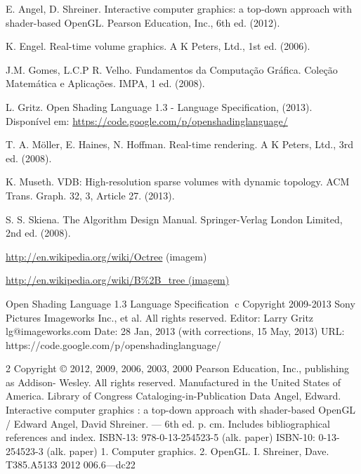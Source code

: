 \begin{thebibliography}{99}


E. Angel, D. Shreiner.  Interactive computer graphics: a top-down approach with shader-based OpenGL. Pearson Education, Inc., 6th ed. (2012).

K. Engel. Real-time volume graphics. A K Peters, Ltd., 1st ed. (2006).

J.M. Gomes, L.C.P R. Velho. Fundamentos da Computa\c{c}\~ao Gr\'afica. Cole\c{c}\~ao Matemática e Aplica\c{c}\~oes. IMPA, 1 ed. (2008).

L. Gritz. Open Shading Language 1.3 - Language Specification, (2013). Disponível em: \url{ https://code.google.com/p/openshadinglanguage/}

T. A. M\"oller, E. Haines, N. Hoffman. Real-time rendering. A K Peters, Ltd., 3rd ed. (2008).

 K. Museth. VDB: High-resolution sparse volumes with dynamic topology. ACM Trans. Graph. 32, 3, Article 27. (2013).

S. S. Skiena. The Algorithm Design Manual. Springer-Verlag London Limited, 2nd ed. (2008).

\url{http://en.wikipedia.org/wiki/Octree} (imagem)

\url{ http://en.wikipedia.org/wiki/B\%2B_tree (imagem)}

\end{thebibliography}
Open Shading Language 1.3
Language Specification
⃝c Copyright 2009-2013 Sony Pictures Imageworks Inc., et al. All rights reserved.
Editor: Larry Gritz
lg@imageworks.com
Date: 28 Jan, 2013
(with corrections, 15 May, 2013)
URL: https://code.google.com/p/openshadinglanguage/

2
Copyright © 2012, 2009, 2006, 2003, 2000 Pearson Education, Inc., publishing as Addison- Wesley. All rights reserved. Manufactured in the United States of America. 
Library of Congress Cataloging-in-Publication Data
Angel, Edward.
Interactive computer graphics : a top-down approach with shader-based OpenGL /
Edward Angel, David Shreiner. — 6th ed. p. cm.
Includes bibliographical references and index.
ISBN-13: 978-0-13-254523-5 (alk. paper)
ISBN-10: 0-13-254523-3 (alk. paper)
1. Computer graphics. 2. OpenGL. I. Shreiner, Dave. T385.A5133 2012
006.6—dc22

